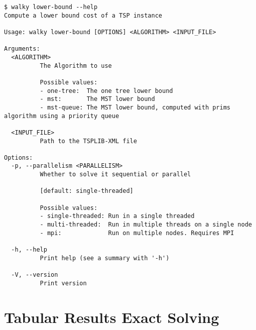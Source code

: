 \begin{verbatim}
$ walky lower-bound --help
Compute a lower bound cost of a TSP instance

Usage: walky lower-bound [OPTIONS] <ALGORITHM> <INPUT_FILE>

Arguments:
  <ALGORITHM>
          The Algorithm to use

          Possible values:
          - one-tree:  The one tree lower bound
          - mst:       The MST lower bound
          - mst-queue: The MST lower bound, computed with prims algorithm using a priority queue

  <INPUT_FILE>
          Path to the TSPLIB-XML file

Options:
  -p, --parallelism <PARALLELISM>
          Whether to solve it sequential or parallel
          
          [default: single-threaded]

          Possible values:
          - single-threaded: Run in a single threaded
          - multi-threaded:  Run in multiple threads on a single node
          - mpi:             Run on multiple nodes. Requires MPI

  -h, --help
          Print help (see a summary with '-h')

  -V, --version
          Print version
\end{verbatim}
\section{Tabular Results Exact Solving}

